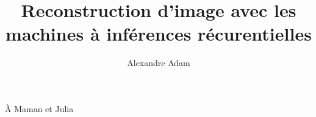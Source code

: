 \documentclass[
  normalmargins,
  11pt,
  openany,
  onehalfspacing,
]{ut-thesis}
\author{Alexandre Adam}
\title{Reconstruction d'image avec les machines à inférences récurentielles}
\begin{document}
  \frontmatter
    \maketitle

    \begin{resume}
    \end{resume}
    \begin{abstract}
    \end{abstract}

    \tableofcontents
    \listoftables
    \listoffigures
    \printglossaries

        \clearpage
    \begin{dedication}
      À Maman et Julia
    \end{dedication}
    \begin{acknowledgements}
            

           


    \end{acknowledgements}
  \mainmatter
    

  

{\footnotesize
  
}

  \appendix
  

\end{document}
